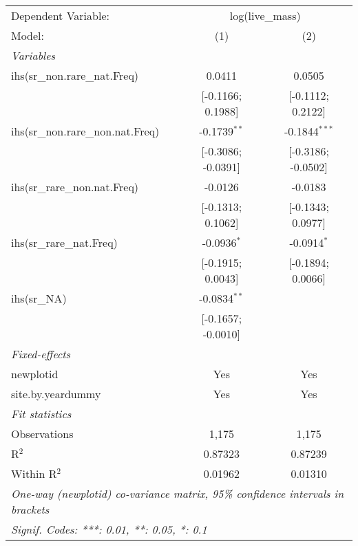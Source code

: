\begin{tabular}{lcc}
\tabularnewline\midrule\midrule
Dependent Variable:&\multicolumn{2}{c}{log(live\_mass)}\\
Model:&(1) & (2)\\
\midrule \emph{Variables}&   &  \\
ihs(sr\_non.rare\_nat.Freq)&0.0411 & 0.0505\\
  &[-0.1166; 0.1988] & [-0.1112; 0.2122]\\
ihs(sr\_non.rare\_non.nat.Freq)&-0.1739$^{**}$ & -0.1844$^{***}$\\
  &[-0.3086; -0.0391] & [-0.3186; -0.0502]\\
ihs(sr\_rare\_non.nat.Freq)&-0.0126 & -0.0183\\
  &[-0.1313; 0.1062] & [-0.1343; 0.0977]\\
ihs(sr\_rare\_nat.Freq)&-0.0936$^{*}$ & -0.0914$^{*}$\\
  &[-0.1915; 0.0043] & [-0.1894; 0.0066]\\
ihs(sr\_NA)&-0.0834$^{**}$ &   \\
  &[-0.1657; -0.0010] &   \\
\midrule \emph{Fixed-effects}&   &  \\
newplotid & Yes & Yes\\
site.by.yeardummy & Yes & Yes\\
\midrule \emph{Fit statistics}&  & \\
Observations & 1,175&1,175\\
R$^2$ & 0.87323&0.87239\\
Within R$^2$ & 0.01962&0.01310\\
\midrule\midrule\multicolumn{3}{l}{\emph{One-way (newplotid) co-variance matrix, 95\% confidence intervals in brackets}}\\
\multicolumn{3}{l}{\emph{Signif. Codes: ***: 0.01, **: 0.05, *: 0.1}}\\
\end{tabular}


